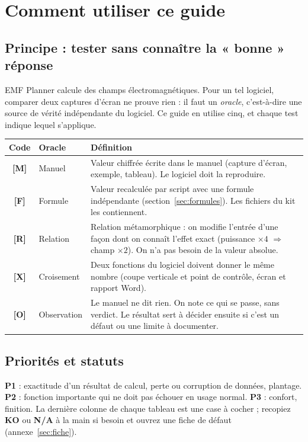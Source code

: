 \section{Comment utiliser ce guide}
\subsection{Principe : tester sans connaître la « bonne » réponse}
EMF Planner calcule des champs électromagnétiques. Pour un tel logiciel, comparer deux captures d'écran ne prouve rien : il faut un \emph{oracle}, c'est-à-dire une source de vérité indépendante du logiciel. Ce guide en utilise cinq, et chaque test indique lequel s'applique.
\begin{center}\small\renewcommand{\arraystretch}{1.2}
\begin{tabular}{@{}cY{3.1cm}Y{10.6cm}@{}}\toprule
\textbf{Code} & \textbf{Oracle} & \textbf{Définition}\\\midrule
\textbf{[M]} & Manuel & Valeur chiffrée écrite dans le manuel (capture d'écran, exemple, tableau). Le logiciel doit la reproduire.\\
\textbf{[F]} & Formule & Valeur recalculée par script avec une formule indépendante (section~\ref{sec:formules}). Les fichiers  du kit les contiennent.\\
\textbf{[R]} & Relation & Relation métamorphique : on modifie l'entrée d'une façon dont on connaît l'effet exact (puissance $\times4$ $\Rightarrow$ champ $\times2$). On n'a pas besoin de la valeur absolue.\\
\textbf{[X]} & Croisement & Deux fonctions du logiciel doivent donner le même nombre (coupe verticale et point de contrôle, écran et rapport Word).\\
\textbf{[O]} & Observation & Le manuel ne dit rien. On note ce qui se passe, sans verdict. Le résultat sert à décider ensuite si c'est un défaut ou une limite à documenter.\\\bottomrule
\end{tabular}\end{center}
\subsection{Priorités et statuts}
\textbf{P1} : exactitude d'un résultat de calcul, perte ou corruption de données, plantage. \textbf{P2} : fonction importante qui ne doit pas échouer en usage normal. \textbf{P3} : confort, finition. La dernière colonne de chaque tableau est une case à cocher ; recopiez \textbf{KO} ou \textbf{N/A} à la main si besoin et ouvrez une fiche de défaut (annexe~\ref{sec:fiche}).

